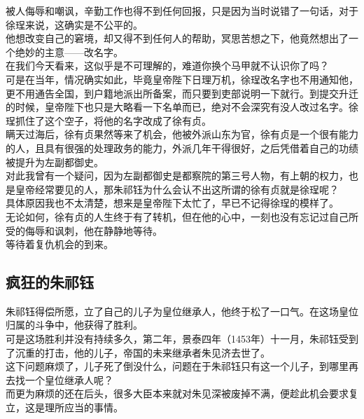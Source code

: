 \begin{multicols}{\theparacolNo}
被人侮辱和嘲讽，辛勤工作也得不到任何回报，只是因为当时说错了一句话，对于徐珵来说，这确实是不公平的。\\

他想改变自己的窘境，却又得不到任何人的帮助，冥思苦想之下，他竟然想出了一个绝妙的主意——改名字。\\

在我们今天看来，这似乎是不可理解的，难道你换个马甲就不认识你了吗？\\

可是在当年，情况确实如此，毕竟皇帝陛下日理万机，徐珵改名字也不用通知他，更不用通告全国，到户籍地派出所备案，而只要到吏部说明一下就行。到提交升迁的时候，皇帝陛下也只是大略看一下名单而已，绝对不会深究有没人改过名字。徐珵抓住了这个空子，将他的名字改成了徐有贞。\\

瞒天过海后，徐有贞果然等来了机会，他被外派山东为官，徐有贞是一个很有能力的人，且具有很强的处理政务的能力，外派几年干得很好，之后凭借着自己的功绩被提升为左副都御史。\\

对此我曾有一个疑问，因为左副都御史是都察院的第三号人物，有上朝的权力，也是皇帝经常要见的人，那朱祁钰为什么会认不出这所谓的徐有贞就是徐珵呢？\\

具体原因我也不太清楚，想来是皇帝陛下太忙了，早已不记得徐珵的模样了。\\

无论如何，徐有贞的人生终于有了转机，但在他的心中，一刻也没有忘记过自己所受的侮辱和讽刺，他在静静地等待。\\

等待着复仇机会的到来。\\

\subsection{疯狂的朱祁钰}
朱祁钰得偿所愿，立了自己的儿子为皇位继承人，他终于松了一口气。在这场皇位归属的斗争中，他获得了胜利。\\

可是这场胜利并没有持续多久，第二年，景泰四年（1453年）十一月，朱祁钰受到了沉重的打击，他的儿子，帝国的未来继承者朱见济去世了。\\

这下问题麻烦了，儿子死了倒没什么，问题在于朱祁钰只有这一个儿子，到哪里再去找一个皇位继承人呢？\\

而更为麻烦的还在后头，很多大臣本来就对朱见深被废掉不满，便趁此机会要求复立，这是理所应当的事情。\\


\end{multicols}
